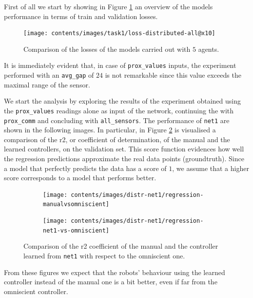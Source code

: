 First of all we start by showing in Figure \ref{fig:distloss} an overview of the 
models performance in terms of train and validation losses. 
\begin{figure}[!htb]
	\centering
	\texttt{[image: contents/images/task1/loss-distributed-all@x10]}%
	\caption{Comparison of the losses of the models carried out with $5$ agents.}
	\label{fig:distloss}
\end{figure}
It is immediately evident that, in case of \texttt{prox\_values} inputs, the 
experiment performed with an \texttt{avg\_gap} of $24$ is not remarkable since 
this value exceeds the maximal range of the sensor.

We start the analysis by exploring the results of the experiment obtained 
using the \texttt{prox\_values} readings alone as input of the network, continuing 
the with \texttt{prox\_comm} and concluding with \texttt{all\_sensors}.
The performance of \texttt{net1} are shown in the following images. In particular,  
in Figure \ref{fig:net1r2} is visualised a comparison of the \gls{r2}, or coefficient 
of determination, of the manual and the learned controllers, on the validation set.
This score function evidences how well the regression predictions approximate 
the real data points (groundtruth). Since a model that perfectly predicts the data 
has a score of $1$, we assume that a higher score corresponds to a model that 
performs better.
\begin{figure}[!htb]
	\centering
	\begin{subfigure}[h]{0.49\textwidth}
		\centering
		\texttt{[image: contents/images/distr-net1/regression-manualvsomniscient]}%
	\end{subfigure}
	\hfill
	\begin{subfigure}[h]{0.49\textwidth}
		\centering
		\texttt{[image: contents/images/distr-net1/regression-net1-vs-omniscient]}
	\end{subfigure}

	\caption[Evaluation of the \gls{r2} coefficient of \texttt{net1} .]{Comparison of 
	the \gls{r2} coefficient of the manual and the controller learned from 
	\texttt{net1} with respect to the omniscient one.}
	\label{fig:net1r2}
\end{figure}

From these figures we expect that the robots' behaviour using the learned 
controller instead of the manual one is a bit better, even if far from the 
omniscient 
controller.

